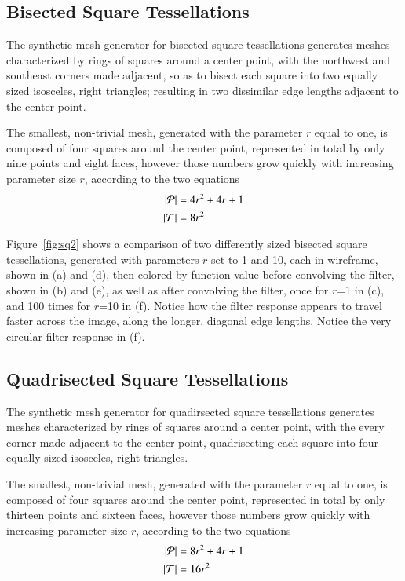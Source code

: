 %
%
%
%
\pagebreak
\subsection{Bisected Square Tessellations}
The synthetic mesh generator for bisected square tessellations generates meshes characterized by rings of squares around a center point, with the northwest and southeast corners made adjacent, so as to bisect each square into two equally sized isosceles, right triangles; resulting in two dissimilar edge lengths adjacent to the center point.

The smallest, non-trivial mesh, generated with the parameter $r$ equal to one, is composed of four squares around the center point, represented in total by only nine points and eight faces, however those numbers grow quickly with increasing parameter size $r$, according to the two equations
\begin{align}
	|\mathcal{P}| &= 4r^2 + 4r + 1 \\
	|\mathcal{T}| &= 8r^2
	\label{eq:sq2PointAndFaceCounts}
\end{align}

Figure~\ref{fig:sq2} shows a comparison of two differently sized bisected square tessellations, generated with parameters $r$ set to 1 and 10, each in wireframe, shown in (a) and (d), then colored by function value before convolving the filter, shown in (b) and (e), as well as after convolving the filter, once for $r$=1 in (c), and 100 times for $r$=10 in (f). Notice how the filter response appears to travel faster across the image, along the longer, diagonal edge lengths. Notice the very circular filter response in (f).

%

%
%
%
%
\pagebreak
\subsection{Quadrisected Square Tessellations}
The synthetic mesh generator for quadirsected square tessellations generates meshes characterized by rings of squares around a center point, with the every corner made adjacent to the center point, quadrisecting each square into four equally sized isosceles, right triangles.

The smallest, non-trivial mesh, generated with the parameter $r$ equal to one, is composed of four squares around the center point, represented in total by only thirteen points and sixteen faces, however those numbers grow quickly with increasing parameter size $r$, according to the two equations
\begin{align}
	|\mathcal{P}| &= 8r^2 + 4r + 1 \\
	|\mathcal{T}| &= 16r^2
	\label{eq:sq4PointAndFaceCounts}
\end{align}

